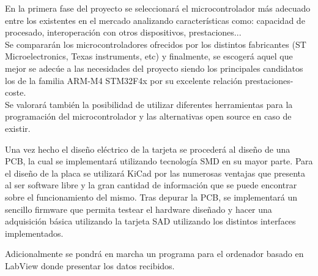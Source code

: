 En la primera fase del proyecto se seleccionará el microcontrolador más adecuado entre los existentes en el mercado analizando características como: capacidad de procesado, interoperación con otros dispositivos, prestaciones...
\\Se compararán los microcontroladores ofrecidos por los distintos fabricantes (ST Microelectronics, Texas instruments, etc) y finalmente, se escogerá aquel que mejor se adecúe a las necesidades del proyecto siendo los principales candidatos los de la familia ARM-M4 STM32F4x por su excelente relación prestaciones-coste.
\\Se valorará también la posibilidad de utilizar diferentes herramientas para la programación del microcontrolador y las alternativas open source en caso de existir.

Una vez hecho el diseño eléctrico de la tarjeta se procederá al diseño de una PCB, la cual se implementará utilizando tecnología SMD en su mayor parte. Para el diseño de la placa se utilizará KiCad por las numerosas ventajas que presenta al ser software libre y la gran cantidad de información que se puede encontrar sobre el funcionamiento del mismo.
Tras depurar la PCB, se implementará un sencillo firmware que permita testear el hardware diseñado y hacer una adquisición básica utilizando la tarjeta SAD utilizando los distintos interfaces implementados.

Adicionalmente se pondrá en marcha un programa para el ordenador basado en LabView donde presentar los datos recibidos.
